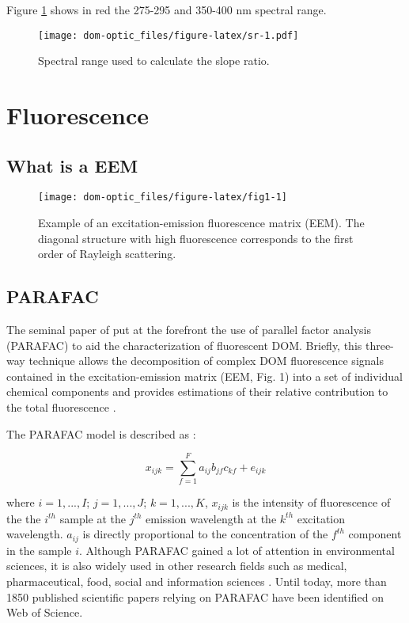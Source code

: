 \documentclass[]{book}
\begin{document}
Figure \ref{fig:sr} shows in red the 275-295 and 350-400 nm spectral
range.

\begin{figure}[htbp]
\centering
\texttt{[image: dom-optic\_files/figure-latex/sr-1.pdf]}
\caption{\label{fig:sr}Spectral range used to calculate the slope ratio.}
\end{figure}

\chapter{Fluorescence}\label{fluorescence}

\section{What is a EEM}\label{what-is-a-eem}

\begin{figure}

{\centering \texttt{[image: dom-optic\_files/figure-latex/fig1-1]} 

}

\caption{Example of an excitation-emission fluorescence matrix (EEM). The diagonal structure with high fluorescence corresponds to the first order of Rayleigh scattering.}\label{fig:fig1}
\end{figure}

\section{PARAFAC}\label{parafac}

The seminal paper of \citep{Stedmon2003a} put at the forefront the use
of parallel factor analysis (PARAFAC) to aid the characterization of
fluorescent DOM. Briefly, this three-way technique allows the
decomposition of complex DOM fluorescence signals contained in the
excitation-emission matrix (EEM, Fig. 1) into a set of individual
chemical components and provides estimations of their relative
contribution to the total fluorescence
\citep{Bro1997, Fellman2010, Stedmon2003a}.

The PARAFAC model is described as \citep{Bro1997, Harshman1970}:

\begin{equation}
x_{ijk} = \sum_{f=1}^{F} a_{ij}b_{jf}c_{kf} + e_{ijk}
\end{equation}

where \(i = 1, ..., I\); \(j = 1, ..., J\); \(k = 1, ..., K\),
\(x_{ijk}\) is the intensity of fluorescence of the the \(i^{th}\)
sample at the \(j^{th}\) emission wavelength at the \(k^{th}\)
excitation wavelength. \(a_{ij}\) is directly proportional to the
concentration of the \(f^{th}\) component in the sample \(i\). Although
PARAFAC gained a lot of attention in environmental sciences, it is also
widely used in other research fields such as medical, pharmaceutical,
food, social and information sciences \citep{Murphy2013}. Until today,
more than 1850 published scientific papers relying on PARAFAC have been
identified on Web of Science.
\end{document}

